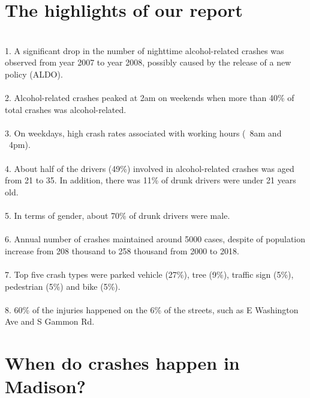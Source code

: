 \documentclass[15pt]{article}
\begin{document}
\section{The highlights of our report}
~\\
1. A significant drop in the number of nighttime alcohol-related crashes was observed from year 2007 to year 2008, possibly caused by the release of a new policy (ALDO).
~\\
~\\
2. Alcohol-related crashes peaked at 2am on weekends when more than 40\% of total crashes was alcohol-related.
~\\
~\\
3. On weekdays, high crash rates associated with working hours (~8am and ~4pm). 
~\\
~\\
4. About half of the drivers (49\%) involved in alcohol-related crashes was aged from 21 to 35. In addition, there was 11\% of drunk drivers were under 21 years old. 
~\\
~\\
5. In terms of gender, about 70\% of drunk drivers were male.
~\\
~\\
6. Annual number of crashes maintained around 5000 cases, despite of population increase from 208 thousand to 258 thousand from 2000 to 2018. 
~\\
~\\
7. Top five crash types were parked vehicle (27\%), tree (9\%), traffic sign (5\%), pedestrian (5\%) and bike (5\%).
~\\
~\\
8. 60\% of the injuries happened on the 6\% of the streets, such as E Washington Ave and S Gammon Rd. 

\newpage
\section{When do crashes happen in Madison?}
\end{document}
